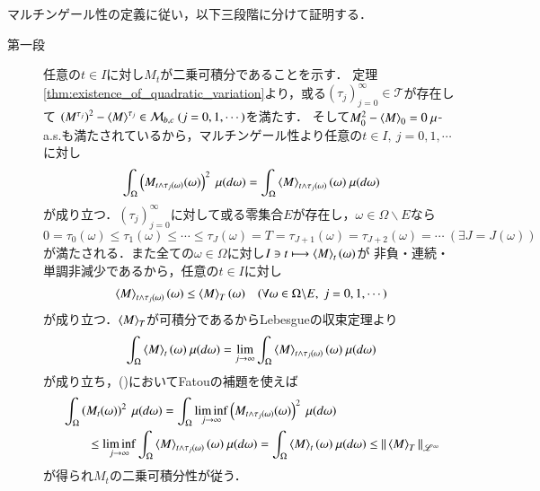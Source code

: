 	\begin{prf} マルチンゲール性の定義に従い，以下三段階に分けて証明する．
		\begin{description}
			\item[第一段] 任意の$t \in I$に対し$M_t$が二乗可積分であることを示す．
				定理\ref{thm:existence_of_quadratic_variation}より，或る$(\tau_j)_{j=0}^{\infty} \in \mathcal{T}$が存在して
				$\left(M^{\tau_j} \right)^2 - \inprod<M>^{\tau_j} \in \mathcal{M}_{b,c}\ (j=0,1,\cdots)$を満たす．
				そして$M^2_0 - \inprod<M>_0 = 0\ \mu$-a.s.も満たされているから，マルチンゲール性より任意の$t \in I,\ j=0,1,\cdots$に対し
				\begin{align}
					\int_\Omega \left( M_{t \wedge \tau_j(\omega)}(\omega) \right)^2\ \mu(d\omega)
					= \int_\Omega \inprod<M>_{t \wedge \tau_j(\omega)}(\omega)\ \mu(d\omega)
					\label{thm:thm_quadratic_variation_bounded_then_M_2c_1}
				\end{align}
				が成り立つ．$(\tau_j)_{j=0}^{\infty}$に対して或る零集合$E$が存在し，$\omega \in \Omega \backslash E$なら
				$0 = \tau_0(\omega) \leq \tau_1(\omega) \leq \cdots \leq \tau_{J}(\omega) = T = \tau_{J+1}(\omega) = \tau_{J+2}(\omega) = \cdots\ (\exists J = J(\omega))$
				が満たされる．また全ての$\omega \in \Omega$に対し$I \ni t \longmapsto \inprod<M>_t(\omega)$が
				非負・連続・単調非減少であるから，任意の$t \in I$に対し
				\begin{align}
					\inprod<M>_{t \wedge \tau_j(\omega)}(\omega) \leq \inprod<M>_T(\omega)
					\quad (\forall \omega \in \Omega \backslash E,\ j=0,1,\cdots)
				\end{align}
				が成り立つ．$\inprod<M>_T$が可積分であるからLebesgueの収束定理より
				\begin{align}
					\int_\Omega \inprod<M>_t(\omega)\ \mu(d\omega)
					= \lim_{j \to \infty} \int_\Omega \inprod<M>_{t \wedge \tau_j(\omega)}(\omega)\ \mu(d\omega)
				\end{align}
				が成り立ち，()においてFatouの補題を使えば
				\begin{align}
					&\int_\Omega \left( M_t(\omega) \right)^2\ \mu(d\omega)
					= \int_\Omega \liminf_{j \to \infty} \left( M_{t \wedge \tau_j(\omega)}(\omega) \right)^2\ \mu(d\omega) \\
					&\qquad \leq \liminf_{j \to \infty} \int_\Omega \inprod<M>_{t \wedge \tau_j(\omega)}(\omega)\ \mu(d\omega)
					= \int_\Omega \inprod<M>_t(\omega)\ \mu(d\omega)
					\leq \Norm{\inprod<M>_T}{\mathscr{L}^{\infty}}
				\end{align}
				が得られ$M_t$の二乗可積分性が従う．
			

\end{description}
\end{prf}
